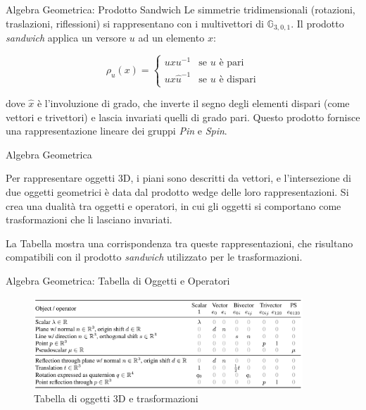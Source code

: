 \begin{frame}{Algebra Geometrica: Prodotto Sandwich}
    Le simmetrie tridimensionali (rotazioni, traslazioni, riflessioni) si rappresentano 
    con i multivettori di \( \mathbb{G}_{3,0,1} \). Il prodotto \textit{sandwich} applica 
    un versore \( u \) ad un elemento \( x \):

    \[
        \rho_u(x) = 
        \begin{cases}
            u x u^{-1} & \text{se } u \text{ è pari} \\
            u x \hat{u}^{-1} & \text{se } u \text{ è dispari}
        \end{cases}
    \]

    dove \( \hat{x} \) è l'involuzione di grado, che inverte il segno degli elementi 
    dispari (come vettori e trivettori) e lascia invariati quelli di grado pari. 
    Questo prodotto fornisce una rappresentazione lineare dei gruppi \textit{Pin} e 
    \textit{Spin}.

\end{frame}

\begin{frame}{Algebra Geometrica}

    Per rappresentare oggetti 3D, i piani sono descritti da vettori, e l'intersezione 
    di due oggetti geometrici è data dal prodotto wedge delle loro rappresentazioni. 
    Si crea una dualità tra oggetti e operatori, in cui gli oggetti 
    si comportano come trasformazioni che li lasciano invariati.

    La Tabella mostra una corrispondenza tra queste rappresentazioni, che risultano 
    compatibili con il prodotto \textit{sandwich} utilizzato per le trasformazioni.

\end{frame}

\begin{frame}{Algebra Geometrica: Tabella di Oggetti e Operatori}
    \begin{figure}
        \centering
        \includegraphics[width=0.9\textwidth]{../Images/relazioneOggettiOperatori.png}
        \caption{Tabella di oggetti 3D e trasformazioni}
        \label{fig:relazioneOggettiOperatori}
    \end{figure}
\end{frame}

